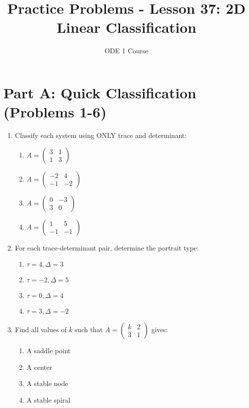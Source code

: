 \documentclass[12pt]{article}
\title{Practice Problems - Lesson 37: 2D Linear Classification}
\author{ODE 1 Course}
\date{}
\begin{document}
\maketitle

\section*{Part A: Quick Classification (Problems 1-6)}

\begin{enumerate}
\item Classify each system using ONLY trace and determinant:
\begin{enumerate}[label=(\alph*)]
    \item $A = \begin{pmatrix} 3 & 1 \\ 1 & 3 \end{pmatrix}$
    \item $A = \begin{pmatrix} -2 & 4 \\ -1 & -2 \end{pmatrix}$
    \item $A = \begin{pmatrix} 0 & -3 \\ 3 & 0 \end{pmatrix}$
    \item $A = \begin{pmatrix} 1 & 5 \\ -1 & -1 \end{pmatrix}$
\end{enumerate}

\item For each trace-determinant pair, determine the portrait type:
\begin{enumerate}[label=(\alph*)]
    \item $\tau = 4, \Delta = 3$
    \item $\tau = -2, \Delta = 5$
    \item $\tau = 0, \Delta = 4$
    \item $\tau = 3, \Delta = -2$
\end{enumerate}

\item Find all values of $k$ such that $A = \begin{pmatrix} k & 2 \\ 3 & 1 \end{pmatrix}$ gives:
\begin{enumerate}[label=(\alph*)]
    \item A saddle point
    \item A center
    \item A stable node
    \item A stable spiral
\end{enumerate}


\end{enumerate}
\end{document}
